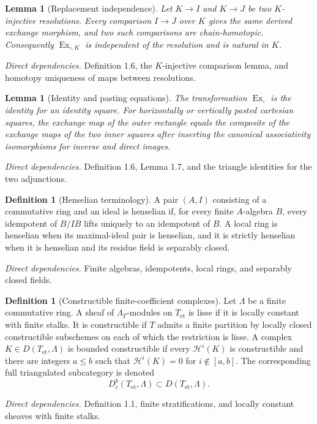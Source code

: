 \documentclass[10pt]{article}
\newtheorem{lemma}[theorem]{Lemma}
\theoremstyle{definition}
\newtheorem{definition}[theorem]{Definition}
\newcommand{\Dbc}{D^b_c}
\newcommand{\Et}{\mathrm{et}}
\newcommand{\Ex}{\operatorname{Ex}}
\newcommand{\deps}[1]{\par\smallskip\textit{Direct dependencies.} #1\par}
\begin{document}
\begin{lemma}[Replacement independence]
Let $K\to I$ and $K\to J$ be two $K$-injective resolutions.  Every
comparison $I\to J$ over $K$ gives the same derived exchange morphism, and
two such comparisons are chain-homotopic.  Consequently
$\Ex_{\square,K}$ is independent of the resolution and is natural in
$K$.
\end{lemma}
\deps{Definition 1.6, the $K$-injective comparison lemma, and homotopy
uniqueness of maps between resolutions.}

\begin{lemma}[Identity and pasting equations]
The transformation $\Ex_{\square}$ is the identity for an identity square.
For horizontally or vertically pasted cartesian squares, the exchange map
of the outer rectangle equals the composite of the exchange maps of the
two inner squares after inserting the canonical associativity
isomorphisms for inverse and direct images.
\end{lemma}
\deps{Definition 1.6, Lemma 1.7, and the triangle identities for the two
adjunctions.}

\begin{definition}[Henselian terminology]
A pair $(A,I)$ consisting of a commutative ring and an ideal is henselian
if, for every finite $A$-algebra $B$, every idempotent of $B/IB$ lifts
uniquely to an idempotent of $B$.  A local ring is henselian when its
maximal-ideal pair is henselian, and it is strictly henselian when it is
henselian and its residue field is separably closed.
\end{definition}
\deps{Finite algebras, idempotents, local rings, and separably closed
fields.}

\begin{definition}[Constructible finite-coefficient complexes]
Let $\Lambda$ be a finite commutative ring.  A sheaf of
$\Lambda_T$-modules on $T_{\Et}$ is lisse if it is locally constant with
finite stalks.  It is constructible if $T$ admits a finite partition by
locally closed constructible subschemes on each of which the restriction is
lisse.  A complex $K\in D(T_{\Et},\Lambda)$ is bounded constructible if
every $\mathcal H^i(K)$ is constructible and there are integers $a\leq b$
such that $\mathcal H^i(K)=0$ for $i\notin[a,b]$.  The corresponding full
triangulated subcategory is denoted
\[
 \Dbc(T_{\Et},\Lambda)\subset D(T_{\Et},\Lambda).
\]
\end{definition}
\deps{Definition 1.1, finite stratifications, and locally constant sheaves
with finite stalks.}
\end{document}
